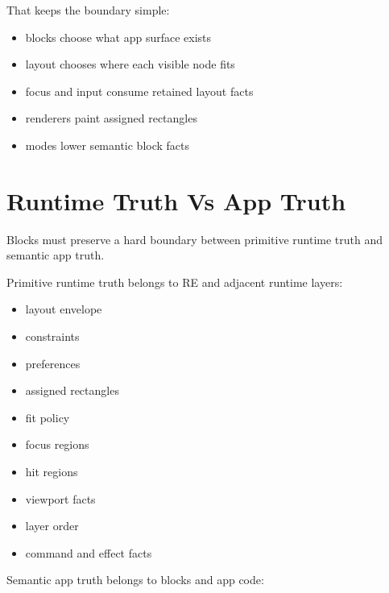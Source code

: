 That keeps the boundary simple:

\begin{itemize}
\tightlist
\item
  blocks choose what app surface exists
\item
  layout chooses where each visible node fits
\item
  focus and input consume retained layout facts
\item
  renderers paint assigned rectangles
\item
  modes lower semantic block facts
\end{itemize}

\section{Runtime Truth Vs App Truth}\label{record-128-runtime-truth-vs-app-truth}

Blocks must preserve a hard boundary between primitive runtime truth and semantic app truth.

Primitive runtime truth belongs to RE and adjacent runtime layers:

\begin{itemize}
\tightlist
\item
  layout envelope
\item
  constraints
\item
  preferences
\item
  assigned rectangles
\item
  fit policy
\item
  focus regions
\item
  hit regions
\item
  viewport facts
\item
  layer order
\item
  command and effect facts
\end{itemize}

Semantic app truth belongs to blocks and app code:

